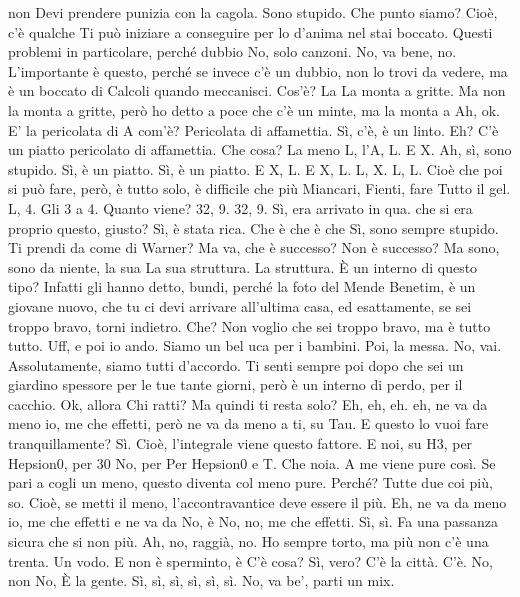 \begin{soluzione}
non Devi prendere punizia con la cagola. Sono stupido. Che punto siamo? Cioè, c'è qualche Ti può iniziare a conseguire per lo d'anima nel stai boccato. Questi problemi in particolare, perché dubbio No, solo canzoni. No, va bene, no. L'importante è questo, perché se invece c'è un dubbio, non lo trovi da vedere, ma è un boccato di Calcoli quando meccanisci. Cos'è? La La monta a gritte. Ma non la monta a gritte, però ho detto a poce che c'è un minte, ma la monta a Ah, ok. E' la pericolata di A com'è? Pericolata di affamettia. Sì, c'è, è un linto. Eh? C'è un piatto pericolato di affamettia. Che cosa? La meno L, l'A, L. E X. Ah, sì, sono stupido. Sì, è un piatto. Sì, è un piatto. E X, L. E X, L. L, X. L, L. Cioè che poi si può fare, però, è tutto solo, è difficile che più Miancari, Fienti, fare Tutto il gel. L, 4. Gli 3 a 4. Quanto viene? 32, 9. 32, 9. Sì, era arrivato in qua. che si era proprio questo, giusto? Sì, è stata rica. Che è che è che Sì, sono sempre stupido. Ti prendi da come di Warner? Ma va, che è successo? Non è successo? Ma sono, sono da niente, la sua La sua struttura. La struttura. È un interno di questo tipo? Infatti gli hanno detto, bundi, perché la foto del Mende Benetim, è un giovane nuovo, che tu ci devi arrivare all'ultima casa, ed esattamente, se sei troppo bravo, torni indietro. Che? Non voglio che sei troppo bravo, ma è tutto tutto. Uff, e poi io ando. Siamo un bel uca per i bambini. Poi, la messa. No, vai. Assolutamente, siamo tutti d'accordo. Ti senti sempre poi dopo che sei un giardino spessore per le tue tante giorni, però è un interno di perdo, per il cacchio. Ok, allora Chi ratti? Ma quindi ti resta solo? Eh, eh, eh. eh, ne va da meno io, me che effetti, però ne va da meno a ti, su Tau. E questo lo vuoi fare tranquillamente? Sì. Cioè, l'integrale viene questo fattore. E noi, su H3, per Hepsion0, per 30 No, per Per Hepsion0 e T. Che noia. A me viene pure così. Se pari a cogli un meno, questo diventa col meno pure. Perché? Tutte due coi più, so. Cioè, se metti il meno, l'accontravantice deve essere il più. Eh, ne va da meno io, me che effetti e ne va da No, è No, no, me che effetti. Sì, sì. Fa una passanza sicura che si non più. Ah, no, raggià, no. Ho sempre torto, ma più non c'è una trenta. Un vodo. E non è sperminto, è C'è cosa? Sì, vero? C'è la città. C'è. No, non No, È la gente. Sì, sì, sì, sì, sì, sì. No, va be', parti un mix. 
   

\end{soluzione}
